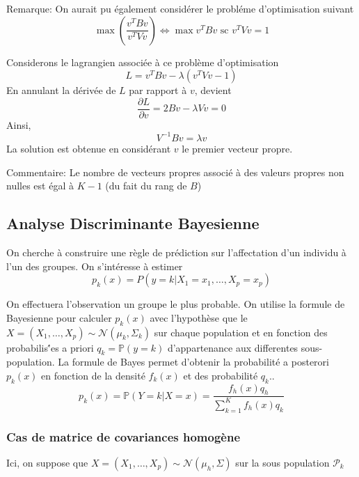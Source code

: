 \documentclass{article}
\begin{document}
Remarque:  On aurait pu  \'egalement consid\'erer le probl\'eme d'optimisation suivant
\begin{equation}
\max  (\frac{v^TBv}{v^TVv})\Leftrightarrow \max v^TBv \text{ sc } v^TVv=1
\end{equation}

Considerons le lagrangien associ\'ee \`a ce probl\`eme d'optimisation
\begin{equation}
L=v^TBv-\lambda (v^TVv-1)
\end{equation}
En annulant la d\'eriv\'ee de $L$ par rapport \`a $v$, devient
\begin{equation}
\frac{\partial L}{\partial v}=2Bv-\lambda Vv=0
\end{equation}
Ainsi,
\begin{equation}
V^{-1}Bv=\lambda v
\end{equation}
La solution est obtenue en consid\'erant $v$ le premier vecteur propre.

Commentaire: Le nombre de vecteurs propres associ\'e \`a des valeurs propres non nulles est \'egal \`a $K-1$ (du fait du rang de $B$)

\subsection{Analyse Discriminante Bayesienne}

On cherche \`a construire une r\`egle de pr\'ediction sur l'affectation  d'un individu \`a l'un des groupes.
On s'int\'eresse \`a estimer
\begin{equation}
p_k(x)=P(y=k|X_1=x_1, \ldots,X_p=x_p)
\end{equation}

On effectuera l'observation un groupe le plus probable.
On utilise la formule de Bayesienne pour calculer $p_k(x)$  avec l'hypoth\`ese que le $X=(X_1,\ldots,X_p)\sim\mathcal{N}(\mu_k,\Sigma_k)$ sur chaque population et en fonction des probabilis\''es a priori $q_k=\mathbb{P}(y=k)$ d'appartenance aux differentes sous-population. La formule de Bayes permet d'obtenir la probabilit\'e a posterori $p_k(x)$ en fonction de la densit\'e $f_k(x)$
 et des probabilit\'e $q_k$..
\begin{equation}
p_k(x)=\mathbb{P}(Y=k|X=x)=\frac{f_h(x)q_h}{\sum_{k=1}^K f_h(x)q_k}
\end{equation}
\subsubsection{Cas de matrice de covariances homog\`ene}
Ici, on suppose que $X=(X_1,\ldots,X_p)\sim\mathcal{N}(\mu_h,\Sigma)$ sur la sous population $\mathcal{P}_k$
\end{document}
